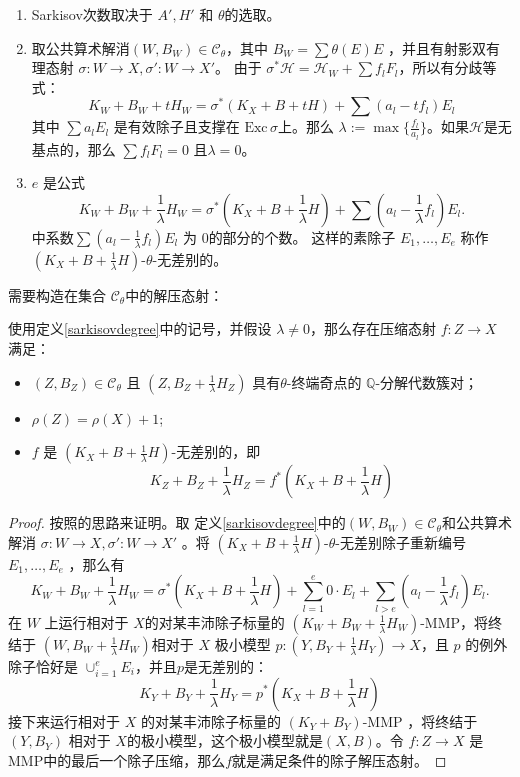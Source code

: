 \begin{remark}
  \begin{enumerate}
    \item  Sarkisov次数取决于  $A', H'$ 和  $\theta$的选取。
    \item   取公共算术解消$ (W,B_W)\in \mathcal{C}_\theta $，其中 $ B_W=\sum \theta(E)E $ ，并且有射影双有理态射 $ \sigma:W\to X , \sigma':W\to X' $。 由于 $\sigma^*\mathcal{H}=\mathcal{H}_W+\sum f_{l}F_{l}$，所以有分歧等式：
          \[ K_W+B_W+tH_W=\sigma^*(K_X+B+tH)+\sum(a_l-tf_l)E_l \]
          其中 $ \sum a_lE_l $ 是有效除子且支撑在 $ \mathrm{Exc}\,\sigma $上。那么 $\lambda:=\max\{ \frac{f_l}{a_l}\}$。如果$ \mathcal{H} $是无基点的，那么 $ \sum f_lF_l=0 $ 且$\lambda=0  $。
    \item   $ e $ 是公式
          \[ K_W+B_W+\frac{1}{\lambda} H_W=\sigma^*(K_X+B+\frac{1}{\lambda} H)+\sum(a_l-\frac{1}{\lambda} f_l)E_l .\]
      中系数$\sum(a_l-\frac{1}{\lambda}f_l)E_l$ 为 $ 0 $的部分的个数。
          这样的素除子 $E_{1},\ldots, E_{e}$ 称作 $(K_{X}+B+\frac{1}{\lambda}H)$-$\theta$-无差别的。
  \end{enumerate}
\end{remark}
需要构造在集合 $\mathcal{C}_{\theta}$中的解压态射：
\begin{lemma}\label{thetaextraction}
  使用定义\ref{sarkisovdegree}中的记号，并假设 $\lambda \neq 0$，那么存在压缩态射  $f: Z\to X$ 满足：
  \begin{itemize}
    \item $(Z,B_{Z})\in \mathcal{C}_{\theta}$ 且 $(Z,B_{Z}+\frac{1}{\lambda}H_{Z})$ 具有$\theta$-终端奇点的 $\mathbb{Q}$-分解代数簇对；
    \item  $\rho(Z)=\rho(X)+1$;
    \item $f$ 是 $(K_{X}+B+\frac{1}{\lambda}H)$-无差别的，即
          \[
            K_{Z}+B_{Z}+\frac{1}{\lambda}H_{Z}=f^*(K_{X}+B+\frac{1}{\lambda}H)
           \]
  \end{itemize}
\end{lemma}
\begin{proof}
  按照\cite[Proposition 1.6]{brunoLogSarkisovProgram1995}的思路来证明。取 定义\ref{sarkisovdegree}中的$ (W,B_{W})\in \mathcal{C}_{\theta}$和公共算术解消  $\sigma:W\to X,\sigma':W \to X'$ 。将 $(K_{X}+B+\frac{1}{\lambda}H)$-$\theta$-无差别除子重新编号 $E_{1},\ldots ,E_{e}$ ，那么有
  \[ K_W+B_W+\frac{1}{\lambda} H_W=\sigma^*(K_X+B+\frac{1}{\lambda} H)+\sum_{l=1}^{e} 0\cdot E_{l}+\sum_{l>e}(a_l-\frac{1}{\lambda} f_l)E_l .\]
  在 $W$ 上运行相对于 $X$的对某丰沛除子标量的  $(K_{W}+B_{W}+\frac{1}{\lambda}H_{W})$-MMP，将终结于 $(W, B_{W}+\frac{1}{\lambda}H_{W})$相对于 $X$ 极小模型 $p:(Y, B_{Y}+\frac{1}{\lambda}H_{Y})\to X$，且 $p$ 的例外除子恰好是 $\cup_{i=1}^{e}E_{i}$，并且$p$是无差别的：
  \[
    K_{Y}+B_{Y}+\frac{1}{\lambda}H_{Y}=p^*(K_{X}+B+\frac{1}{\lambda}H)
    \]
  接下来运行相对于 $X$ 的对某丰沛除子标量的  $(K_{Y}+B_{Y})$-MMP ，将终结于  $(Y,B_{Y})$ 相对于 $X$的极小模型，这个极小模型就是$(X,B)$。令 $f: Z\to X$ 是MMP中的最后一个除子压缩，那么$f$就是满足条件的除子解压态射。
\end{proof}

